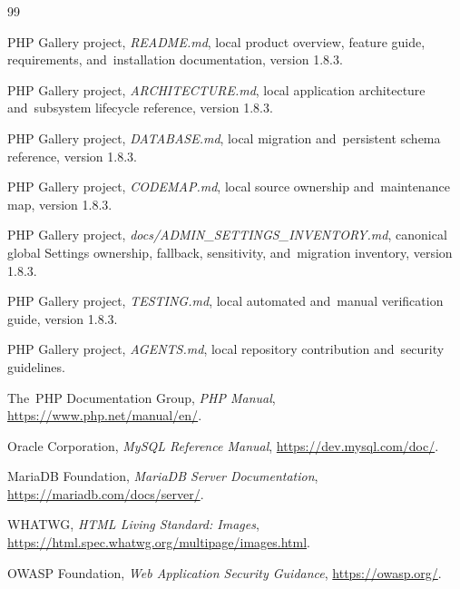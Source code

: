 \documentclass[11pt,a4paper]{article}
\newcommand{\version}{1.8.3}
\begin{document}
\begin{thebibliography}{99}

PHP Gallery project, \emph{README.md}, local product overview, feature guide,
requirements, and~installation documentation, version \version.

PHP Gallery project, \emph{ARCHITECTURE.md}, local application architecture
and~subsystem lifecycle reference, version \version.

PHP Gallery project, \emph{DATABASE.md}, local migration and~persistent schema
reference, version \version.

PHP Gallery project, \emph{CODEMAP.md}, local source ownership and~maintenance
map, version \version.

PHP Gallery project, \emph{docs/ADMIN\_SETTINGS\_INVENTORY.md}, canonical global
Settings ownership, fallback, sensitivity, and~migration inventory, version
\version.

PHP Gallery project, \emph{TESTING.md}, local automated and~manual verification
guide, version \version.

PHP Gallery project, \emph{AGENTS.md}, local repository contribution
and~security guidelines.

The~PHP Documentation Group, \emph{PHP Manual},
\url{https://www.php.net/manual/en/}.

Oracle Corporation, \emph{MySQL Reference Manual},
\url{https://dev.mysql.com/doc/}.

MariaDB Foundation, \emph{MariaDB Server Documentation},
\url{https://mariadb.com/docs/server/}.

WHATWG, \emph{HTML Living Standard: Images},
\url{https://html.spec.whatwg.org/multipage/images.html}.

OWASP Foundation, \emph{Web Application Security Guidance},
\url{https://owasp.org/}.

\end{thebibliography}

\clearpage
{}
{}
\printindex
\end{document}
